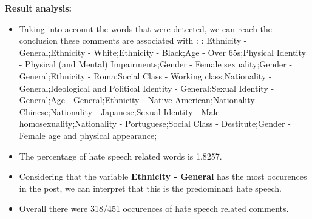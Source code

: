 \documentclass[11pt]{article}
\begin{document}
\textbf{\Large Result analysis:}

\begin{itemize}\item Taking into account the words that were detected, we can reach the conclusion these comments are associated with : : Ethnicity - General;Ethnicity - White;Ethnicity - Black;Age - Over 65s;Physical Identity - Physical (and Mental) Impairments;Gender - Female sexuality;Gender - General;Ethnicity - Roma;Social Class - Working class;Nationality - General;Ideological and Political Identity - General;Sexual Identity - General;Age - General;Ethnicity - Native American;Nationality - Chinese;Nationality - Japanese;Sexual Identity - Male homosexuality;Nationality - Portuguese;Social Class - Destitute;Gender - Female age and physical appearance;%

\item The percentage of hate speech related words is 1.8257.

\item Considering that the variable \textbf{Ethnicity - General} has the most occurences in the post, we can interpret that this is the predominant hate speech.

\item Overall there were 318/451 occurences of hate speech related comments.\end{itemize}
\end{document}
